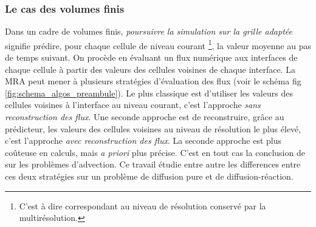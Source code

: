 \subsubsection{Le cas des volumes finis}
Dans un cadre de volumes finis, \emph{poursuivre la simulation sur la grille adaptée} signifie prédire, pour chaque cellule de niveau courant
\footnote{C'est à dire correspondant au niveau de résolution conservé par la multirésolution.}, 
la valeur moyenne au pas de temps suivant. On procède en évaluant un flux numérique aux interfaces de chaque cellule à partir des valeurs des cellules voisines de chaque interface.
La MRA peut mener à plusieurs stratégies d'évaluation des flux (voir le schéma fig \ref{fig:schema_algos_preambule}). 
Le plus classique est d'utiliser les valeurs des cellules voisines à l’interface au niveau courant, c'est l'approche \emph{sans reconstruction des flux}.
Une seconde approche est de reconstruire, grâce au prédicteur, les valeurs des cellules voisines au niveau de résolution le plus élevé, c'est l'approche \emph{avec reconstruction des flux}.
La seconde approche est plus coûteuse en calculs, mais \emph{a priori} plus précise. C'est en tout cas la conclusion de \cite{belloti_et_al_2025,Massot2025_meshAdaptation} sur les problèmes d’advection.
Ce travail étudie entre autre les differences entre ces deux stratégies sur un problème de diffusion pure et de diffusion-réaction. 
